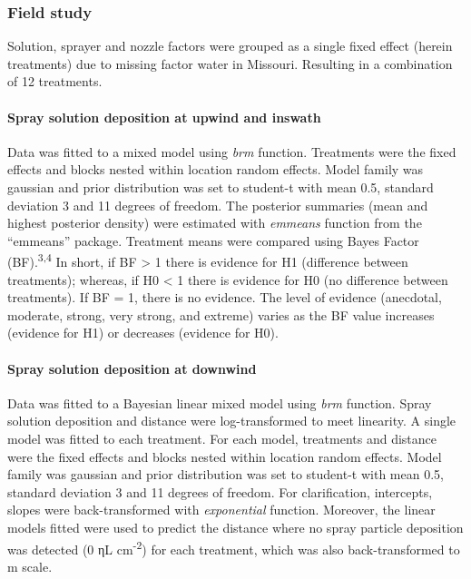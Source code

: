 \documentclass[
  12pt,
  a4paper,
]{article}
\begin{document}
\hypertarget{field-study-1}{%
\subsubsection{Field study}\label{field-study-1}}

Solution, sprayer and nozzle factors were grouped as a single fixed
effect (herein treatments) due to missing factor water in Missouri.
Resulting in a combination of 12 treatments.

\hypertarget{spray-solution-deposition-at-upwind-and-inswath}{%
\paragraph{Spray solution deposition at upwind and
inswath}\label{spray-solution-deposition-at-upwind-and-inswath}}

Data was fitted to a mixed model using \emph{brm} function. Treatments
were the fixed effects and blocks nested within location random effects.
Model family was gaussian and prior distribution was set to student-t
with mean 0.5, standard deviation 3 and 11 degrees of freedom. The
posterior summaries (mean and highest posterior density) were estimated
with \emph{emmeans} function from the ``emmeans'' package. Treatment
means were compared using Bayes Factor (BF).\textsuperscript{3,4} In
short, if BF \textgreater{} 1 there is evidence for H1 (difference
between treatments); whereas, if H0 \textless{} 1 there is evidence for
H0 (no difference between treatments). If BF = 1, there is no evidence.
The level of evidence (anecdotal, moderate, strong, very strong, and
extreme) varies as the BF value increases (evidence for H1) or decreases
(evidence for H0).

\hypertarget{spray-solution-deposition-at-downwind}{%
\paragraph{Spray solution deposition at
downwind}\label{spray-solution-deposition-at-downwind}}

Data was fitted to a Bayesian linear mixed model using \emph{brm}
function. Spray solution deposition and distance were log-transformed to
meet linearity. A single model was fitted to each treatment. For each
model, treatments and distance were the fixed effects and blocks nested
within location random effects. Model family was gaussian and prior
distribution was set to student-t with mean 0.5, standard deviation 3
and 11 degrees of freedom. For clarification, intercepts, slopes were
back-transformed with \emph{exponential} function. Moreover, the linear
models fitted were used to predict the distance where no spray particle
deposition was detected (0 ηL cm\textsuperscript{-2}) for each
treatment, which was also back-transformed to m scale.
\end{document}
